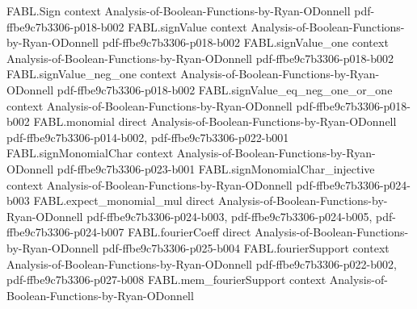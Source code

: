 \begin{theorem}
\label{FABL.exists_noiseStability_sub_arcsine_le_of_regular_homogeneous_threshold}
\leanok
{}
\proofstep
  {FABL.Sign}
  {context}
  {Analysis-of-Boolean-Functions-by-Ryan-ODonnell}
  {pdf-ffbe9c7b3306-p018-b002}
\proofstep
  {FABL.signValue}
  {context}
  {Analysis-of-Boolean-Functions-by-Ryan-ODonnell}
  {pdf-ffbe9c7b3306-p018-b002}
\proofstep
  {FABL.signValue_one}
  {context}
  {Analysis-of-Boolean-Functions-by-Ryan-ODonnell}
  {pdf-ffbe9c7b3306-p018-b002}
\proofstep
  {FABL.signValue_neg_one}
  {context}
  {Analysis-of-Boolean-Functions-by-Ryan-ODonnell}
  {pdf-ffbe9c7b3306-p018-b002}
\proofstep
  {FABL.signValue_eq_neg_one_or_one}
  {context}
  {Analysis-of-Boolean-Functions-by-Ryan-ODonnell}
  {pdf-ffbe9c7b3306-p018-b002}
\proofstep
  {FABL.monomial}
  {direct}
  {Analysis-of-Boolean-Functions-by-Ryan-ODonnell}
  {pdf-ffbe9c7b3306-p014-b002,
    pdf-ffbe9c7b3306-p022-b001}
\proofstep
  {FABL.signMonomialChar}
  {context}
  {Analysis-of-Boolean-Functions-by-Ryan-ODonnell}
  {pdf-ffbe9c7b3306-p023-b001}
\proofstep
  {FABL.signMonomialChar_injective}
  {context}
  {Analysis-of-Boolean-Functions-by-Ryan-ODonnell}
  {pdf-ffbe9c7b3306-p024-b003}
\proofstep
  {FABL.expect_monomial_mul}
  {direct}
  {Analysis-of-Boolean-Functions-by-Ryan-ODonnell}
  {pdf-ffbe9c7b3306-p024-b003,
    pdf-ffbe9c7b3306-p024-b005,
    pdf-ffbe9c7b3306-p024-b007}
\proofstep
  {FABL.fourierCoeff}
  {direct}
  {Analysis-of-Boolean-Functions-by-Ryan-ODonnell}
  {pdf-ffbe9c7b3306-p025-b004}
\proofstep
  {FABL.fourierSupport}
  {context}
  {Analysis-of-Boolean-Functions-by-Ryan-ODonnell}
  {pdf-ffbe9c7b3306-p022-b002,
    pdf-ffbe9c7b3306-p027-b008}
\proofstep
  {FABL.mem_fourierSupport}
  {context}
  {Analysis-of-Boolean-Functions-by-Ryan-ODonnell}

\end{theorem}
